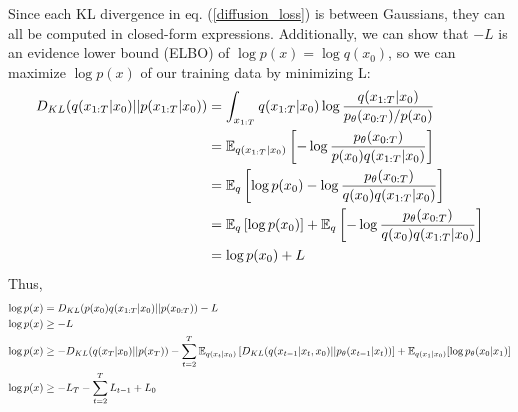 \documentclass{article}
\begin{document}
Since each KL divergence in eq. (\ref{diffusion_loss}) is between Gaussians, they can all be computed in closed-form expressions. Additionally, we can show that $-L$ is an evidence lower bound (ELBO) of $\log p(x) = \log q(x_0)$, so we can maximize $\log p(x)$ of our training data by minimizing L:
\begin{align}
    D_{KL}(q(x_{1:T}|x_0)||p(x_{1:T}|x_0)) &= \int_{x_{1:T}} q(x_{1:T}|x_0) \log\frac{q(x_{1:T}|x_0)}{p_\theta(x_{0:T})/p(x_0)} \\
    &= \mathbb{E}_{q(x_{1:T}|x_0)} \left[-\log \frac{p_\theta(x_{0:T})}{p(x_0)q(x_{1:T}|x_0)}\right] \\
    &= \mathbb{E}_q \left[\log p(x_0) -\log \frac{p_\theta(x_{0:T})}{q(x_0)q(x_{1:T}|x_0)}\right] \\
    &= \mathbb{E}_q \left[\log p(x_0) \right] + \mathbb{E}_q \left[-\log \frac{p_\theta(x_{0:T})}{q(x_0)q(x_{1:T}|x_0)}\right] \\
    &= \log p(x_0) +  L \\
\end{align}
Thus,
\begin{align}
    \log p(x) &= D_{KL}(p(x_0)q(x_{1:T}|x_0)||p(x_{0:T})) - L \\
    \log p(x) &\geq -L \\
    \log p(x) &\geq -D_{KL}(q(x_T|x_0) || p(x_T)) -\sum_{t=2}^T \mathbb{E}_{q(x_t|x_0)}\left[D_{KL}(q(x_{t-1}|x_t,x_0)||p_\theta(x_{t-1}|x_t))\right] + \mathbb{E}_{q(x_1|x_0)}[\log p_\theta(x_0|x_1)] \\
    \log p(x) &\geq -L_T - \sum_{t=2}^T L_{t-1} + L_0
\end{align}
\end{document}
